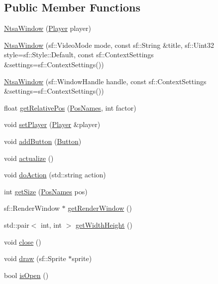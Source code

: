 \subsection*{Public Member Functions}
\begin{DoxyCompactItemize}
\item 
\hyperlink{class_ntsa_window_a12b7135e87d1037a3924a2f5f5799431}{Ntsa\-Window} (\hyperlink{class_player}{Player} player)
\item 
\hyperlink{class_ntsa_window_a1b3f6c3be43c2ecfd108bacb1398f2b0}{Ntsa\-Window} (sf\-::\-Video\-Mode mode, const sf\-::\-String \&title, sf\-::\-Uint32 style=sf\-::\-Style\-::\-Default, const sf\-::\-Context\-Settings \&settings=sf\-::\-Context\-Settings())
\item 
\hyperlink{class_ntsa_window_aeeae6fee36b8479b8925b7f3ba792ed7}{Ntsa\-Window} (sf\-::\-Window\-Handle handle, const sf\-::\-Context\-Settings \&settings=sf\-::\-Context\-Settings())
\item 
float \hyperlink{class_ntsa_window_ac38da02f04c79bc387308a89cd178538}{get\-Relative\-Pos} (\hyperlink{class_ntsa_window_ad45cc5b45dd664a1dd979041e8ab17a3}{Pos\-Names}, int factor)
\item 
void \hyperlink{class_ntsa_window_a67765090ed23a5ba93e29f9558e45351}{set\-Player} (\hyperlink{class_player}{Player} \&player)
\item 
void \hyperlink{class_ntsa_window_ac2991e96dd1dc556961623824ddf682a}{add\-Button} (\hyperlink{class_button}{Button})
\item 
void \hyperlink{class_ntsa_window_aa8d0a7e8928dc1e90a4ca3616218f192}{actualize} ()
\item 
void \hyperlink{class_ntsa_window_ab0b4de4b43e6aa20fc96fbcc0805bad1}{do\-Action} (std\-::string action)
\item 
int \hyperlink{class_ntsa_window_a8504a8160e6c88968662c55ea4587f6c}{get\-Size} (\hyperlink{class_ntsa_window_ad45cc5b45dd664a1dd979041e8ab17a3}{Pos\-Names} pos)
\item 
sf\-::\-Render\-Window $\ast$ \hyperlink{class_ntsa_window_a100372715e96061ae0a06c848e81383f}{get\-Render\-Window} ()
\item 
std\-::pair$<$ int, int $>$ \hyperlink{class_ntsa_window_a04b0c18abd4bbe4a1785c633e17be351}{get\-Width\-Height} ()
\item 
void \hyperlink{class_ntsa_window_a2ed76648e64d49378d9107eadd65feec}{close} ()
\item 
void \hyperlink{class_ntsa_window_ab7f78dc06beb1fe676b21838f4f059e6}{draw} (sf\-::\-Sprite $\ast$sprite)
\item 
bool \hyperlink{class_ntsa_window_ad6b3a6571aeb24840953695a5ada4f42}{is\-Open} ()
\end{DoxyCompactItemize}


